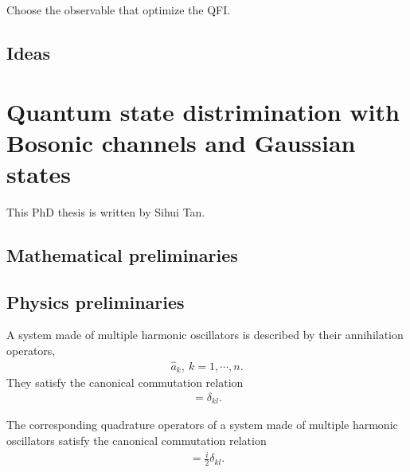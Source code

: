 \documentclass[../../note.tex]{subfiles}
\begin{document}
Choose the observable that optimize the QFI.


\subsection{Ideas}



\section{Quantum state distrimination with Bosonic channels and Gaussian states}
This PhD thesis is written by Sihui Tan.


\subsection{Mathematical preliminaries}
\begin{definition}
    
\end{definition}



\subsection{Physics preliminaries}
\begin{lemma}
    \label{lemma: communtation relations}
    A system made of multiple harmonic oscillators is described by their annihilation operators,
    \begin{align}
        \hat{a}_{k},~k=1,\cdots,n.
    \end{align}
    They satisfy the canonical commutation relation
    \begin{align}
        [\hat{a}_k, \hat{a}_l^\dagger] = \delta_{kl}.
    \end{align}
\end{lemma}

\begin{lemma}
    The corresponding quadrature operators of a system made of multiple harmonic oscillators satisfy the canonical commutation relation
    \begin{align}
        [\hat{q}_k, \hat{p}_l] = \frac{i}{2} \delta_{kl}.
    \end{align}
\end{lemma}
\end{document}
